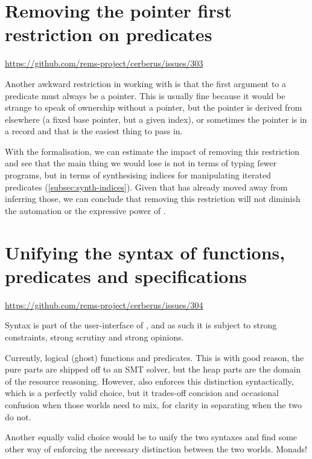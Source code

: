 \section{Removing the pointer first restriction on predicates}\label{sec:rm-ptr-first}
\url{https://github.com/rems-project/cerberus/issues/303}

Another awkward restriction in working with  is that the first argument
to a predicate must always be a pointer. This is usually fine because it would
be strange to speak of ownership without a pointer, but the pointer is derived
from elsewhere (a fixed base pointer, but a given index), or sometimes the
pointer is in a record and that is the easiest thing to pass in.

With the formalisation, we can estimate the impact of removing this restriction
and see that the main thing we would lose is not in terms of typing fewer
programs, but in terms of synthesising indices for manipulating iterated
predicates (\cref{subsec:synth-indices}). Given that  has already moved
away from inferring those, we can
conclude that removing this restriction will not diminish the automation or the
expressive power of .

\section{Unifying the syntax of functions, predicates and specifications}

\url{https://github.com/rems-project/cerberus/issues/304}

Syntax is part of the user-interface of , and as such it is subject to
strong constraints, strong scrutiny and strong opinions.

Currently, logical (ghost) functions and predicates. This is with good reason,
the pure parts are shipped off to an SMT solver, but the heap parts are the
domain of the resource reasoning. However,  also enforces this
distinction syntactically, which is a perfectly valid choice, but it trades-off
concision and occasional confusion when those worlds need to mix, for clarity
in separating when the two do not.

Another equally valid choice would be to unify the two syntaxes and find some
other way of enforcing the necessary distinction between the two worlds.
Monads!

